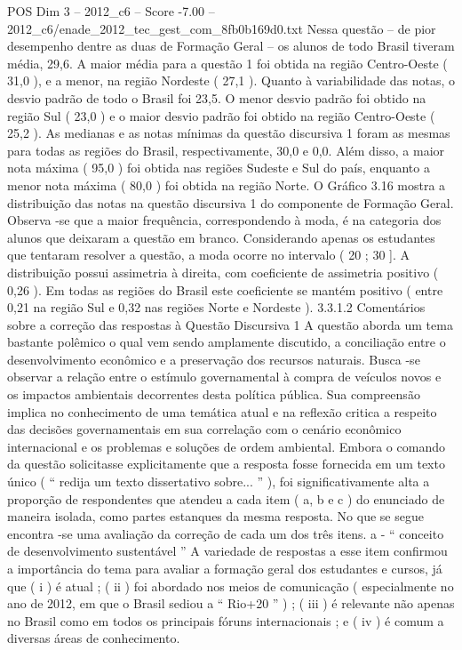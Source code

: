 \begin{textsample}{POS Dim 3 – 2012\_c6 – Score -7.00 – 2012\_c6/enade\_2012\_tec\_gest\_com\_8fb0b169d0.txt}
Nessa questão – de pior desempenho dentre as duas de Formação Geral – os alunos de todo Brasil tiveram média, 29,6.
A maior média para a questão 1 foi obtida na região Centro-Oeste ( 31,0 ), e a menor, na região Nordeste ( 27,1 ).
Quanto à variabilidade das notas, o desvio padrão de todo o Brasil foi 23,5.
O menor desvio padrão foi obtido na região Sul ( 23,0 ) e o maior desvio padrão foi obtido na região Centro-Oeste ( 25,2 ).
As medianas e as notas mínimas da questão discursiva 1 foram as mesmas para todas as regiões do Brasil, respectivamente, 30,0 e 0,0.
Além disso, a maior nota máxima ( 95,0 ) foi obtida nas regiões Sudeste e Sul do país, enquanto a menor nota máxima ( 80,0 ) foi obtida na região Norte.
O Gráfico 3.16 mostra a distribuição das notas na questão discursiva 1 do componente de Formação Geral.
Observa -se que a maior frequência, correspondendo à moda, é na categoria dos alunos que deixaram a questão em branco.
Considerando apenas os estudantes que tentaram resolver a questão, a moda ocorre no intervalo ( 20 ; 30 ].
A distribuição possui assimetria à direita, com coeficiente de assimetria positivo ( 0,26 ).
Em todas as regiões do Brasil este coeficiente se mantém positivo ( entre 0,21 na região Sul e 0,32 nas regiões Norte e Nordeste ). 3.3.1.2 Comentários sobre a correção das respostas à Questão Discursiva 1 A questão aborda um tema bastante polêmico o qual vem sendo amplamente discutido, a conciliação entre o desenvolvimento econômico e a preservação dos recursos naturais.
Busca -se observar a relação entre o estímulo governamental à compra de veículos novos e os impactos ambientais decorrentes desta política pública.
Sua compreensão implica no conhecimento de uma temática atual e na reflexão critica a respeito das decisões governamentais em sua correlação com o cenário econômico internacional e os problemas e soluções de ordem ambiental.
Embora o comando da questão solicitasse explicitamente que a resposta fosse fornecida em um texto único ( “ redija um texto dissertativo sobre... ” ), foi significativamente alta a proporção de respondentes que atendeu a cada item ( a, b e c ) do enunciado de maneira isolada, como partes estanques da mesma resposta.
No que se segue encontra -se uma avaliação da correção de cada um dos três itens. a - “ conceito de desenvolvimento sustentável ” A variedade de respostas a esse item confirmou a importância do tema para avaliar a formação geral dos estudantes e cursos, já que ( i ) é atual ; ( ii ) foi abordado nos meios de comunicação ( especialmente no ano de 2012, em que o Brasil sediou a “ Rio+20 ” ) ; ( iii ) é relevante não apenas no Brasil como em todos os principais fóruns internacionais ; e ( iv ) é comum a diversas áreas de conhecimento.

\end{textsample}
